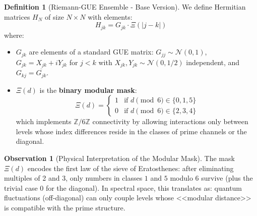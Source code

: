 \documentclass[12pt, a4paper]{article}
\theoremstyle{plain}
\theoremstyle{definition}
\newtheorem{definicion}[teorema]{Definition}
\newtheorem{observacion}[teorema]{Observation}
\theoremstyle{remark}
\newcommand{\Z}{\mathbb{Z}}
\begin{document}
\begin{definicion}[Riemann-GUE Ensemble - Base Version]
\label{def:ensemble_base}
We define Hermitian matrices $H_N$ of size $N \times N$ with elements:
\[
H_{jk} = G_{jk} \cdot \Xi(|j-k|)
\]
where:
\begin{itemize}
\item $G_{jk}$ are elements of a standard GUE matrix: $G_{jj} \sim \mathcal{N}(0,1)$, $G_{jk} = X_{jk} + i Y_{jk}$ for $j < k$ with $X_{jk}, Y_{jk} \sim \mathcal{N}(0,1/2)$ independent, and $G_{kj} = \overline{G_{jk}}$.

\item $\Xi(d)$ is the \textbf{binary modular mask}:
\[
\Xi(d) = 
\begin{cases}
1 & \text{if } d \pmod{6} \in \{0, 1, 5\} \\
0 & \text{if } d \pmod{6} \in \{2, 3, 4\}
\end{cases}
\]
which implements $\Z/6\Z$ connectivity by allowing interactions only between levels whose index differences reside in the classes of prime channels or the diagonal.
\end{itemize}
\end{definicion}

\begin{observacion}[Physical Interpretation of the Modular Mask]
The mask $\Xi(d)$ encodes the first law of the sieve of Eratosthenes: after eliminating multiples of 2 and 3, only numbers in classes $1$ and $5$ modulo 6 survive (plus the trivial case 0 for the diagonal). In spectral space, this translates as: quantum fluctuations (off-diagonal) can only couple levels whose <<modular distance>> is compatible with the prime structure.
\end{observacion}

\end{document}
